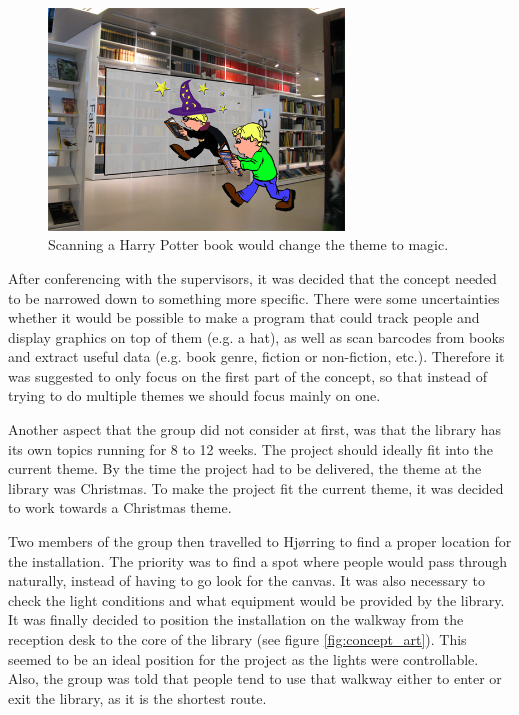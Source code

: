 \begin{figure}[htbp]
\centering
\includegraphics[width=0.7\textwidth]{Pictures/HjoerringLibrary/magician.png}
\caption{Scanning a Harry Potter book would change the theme to magic.}
\label{fig:bookTheme}
\end{figure}

After conferencing with the supervisors, it was decided that the concept needed to be narrowed down to something more specific. There were some uncertainties whether it would be possible to make a program that could track people and display graphics on top of them (e.g. a hat), as well as scan barcodes from books and extract useful data (e.g. book genre, fiction or non-fiction, etc.). Therefore it was suggested to only focus on the first part of the concept, so that instead of trying to do multiple themes we should focus mainly on one.

Another aspect that the group did not consider at first, was that the library has its own topics running for 8 to 12 weeks. The project should ideally fit into the current theme. By the time the project had to be delivered, the theme at the library was Christmas. To make the project fit the current theme, it was decided to work towards a Christmas theme.

Two members of the group then travelled to Hj{\o}rring to find a proper location for the installation. The priority was to find a spot where people would pass through naturally, instead of having to go look for the canvas. It was also necessary to check the light conditions and what equipment would be provided by the library. It was finally decided to position the installation on the walkway from the reception desk to the core of the library (see figure \ref{fig:concept_art}). This seemed to be an ideal position for the project as the lights were controllable. Also, the group was told that people tend to use that walkway either to enter or exit the library, as it is the shortest route. 

